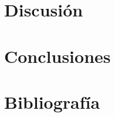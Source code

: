 \documentclass[11pt,a4paper]{article}
\begin{document}
\section{Discusión}
\label{sec:discusion}

\section{Conclusiones}
\label{sec:conclusiones}

\section{Bibliografía}
\end{document}
